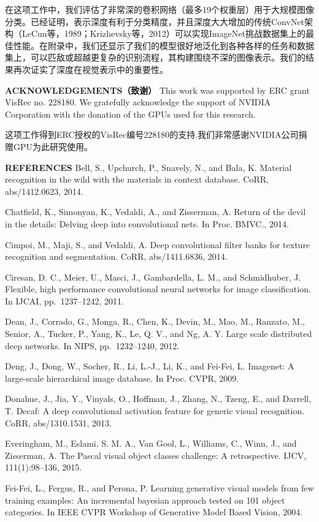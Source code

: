 \documentclass[12pt,a4paper,UTF8,twoside]{book}
\begin{document}
在这项工作中，我们评估了非常深的卷积网络（最多19个权重层）用于大规模图像分类。已经证明，表示深度有利于分类精度，并且深度大大增加的传统ConvNet架构（LeCun等，1989；Krizhevsky等，2012）可以实现ImageNet挑战数据集上的最佳性能。在附录中，我们还显示了我们的模型很好地泛化到各种各样的任务和数据集上，可以匹敌或超越更复杂的识别流程，其构建围绕不深的图像表示。我们的结果再次证实了深度在视觉表示中的重要性。

\textbf{ACKNOWLEDGEMENTS（致谢）}
This work was supported by ERC grant VisRec no. 228180. We gratefully acknowledge the support of NVIDIA Corporation with the donation of the GPUs used for this research.

这项工作得到ERC授权的VisRec编号228180的支持.我们非常感谢NVIDIA公司捐赠GPU为此研究使用。

\textbf{REFERENCES}
Bell, S., Upchurch, P., Snavely, N., and Bala, K. Material recognition in the wild with the materials in context database. CoRR, abs/1412.0623, 2014.

Chatfield, K., Simonyan, K., Vedaldi, A., and Zisserman, A. Return of the devil in the details: Delving deep into convolutional nets. In Proc. BMVC., 2014.

Cimpoi, M., Maji, S., and Vedaldi, A. Deep convolutional filter banks for texture recognition and segmentation. CoRR, abs/1411.6836, 2014.

Ciresan, D. C., Meier, U., Masci, J., Gambardella, L. M., and Schmidhuber, J. Flexible, high performance convolutional neural networks for image classification. In IJCAI, pp.~1237--1242, 2011.

Dean, J., Corrado, G., Monga, R., Chen, K., Devin, M., Mao, M., Ranzato, M., Senior, A., Tucker, P., Yang, K., Le, Q. V., and Ng, A. Y. Large scale distributed deep networks. In NIPS, pp.~1232--1240, 2012.

Deng, J., Dong, W., Socher, R., Li, L.-J., Li, K., and Fei-Fei, L. Imagenet: A large-scale hierarchical image database. In Proc. CVPR, 2009.

Donahue, J., Jia, Y., Vinyals, O., Hoffman, J., Zhang, N., Tzeng, E., and Darrell, T. Decaf: A deep convolutional activation feature for generic visual recognition. CoRR, abs/1310.1531, 2013.

Everingham, M., Eslami, S. M. A., Van Gool, L., Williams, C., Winn, J., and Zisserman, A. The Pascal visual object classes challenge: A retrospective. IJCV, 111(1):98--136, 2015.

Fei-Fei, L., Fergus, R., and Perona, P. Learning generative visual models from few training examples: An incremental bayesian approach tested on 101 object categories. In IEEE CVPR Workshop of Generative Model Based Vision, 2004.
\end{document}
